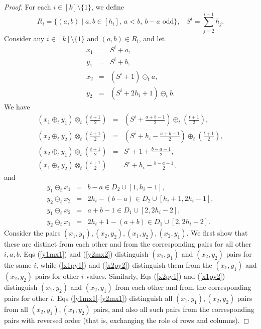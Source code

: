 \documentclass{sn-jnl}
\theoremstyle{definition}
\begin{document}
\begin{proof}
For each $i \in [k]\setminus\{1\}$, we define 
$$R_i = \{ (a,b) \mid a,b \in [h_i], \: a < b, \: b-a \text{ odd} \}, \;\;\; S^i=\sum_{j=2}^{i-1} h_j. $$ 
Consider any $i\in [k]\setminus\{1\}$ and $(a,b)\in R_i$, and let 
\begin{eqnarray*}
    x_1 &=& S^i+a, \\
    y_1 &=& S^i+b, \\
    x_2 &=& (S^i+1) \ominus_t a, \\
    y_2 &=& (S^i+2h_i+1) \ominus_t b.
\end{eqnarray*}
 We have
\begin{eqnarray}
    (x_1 \oplus_t y_1) \otimes_t \left(\frac{t+1}{2}\right) &=& \left(S^i +\frac{a+b-1}{2}\right) \oplus_t \left(\frac{t+1}{2}\right), \label{x1py1} \\
    (x_2 \oplus_t y_2) \otimes_t \left(\frac{t+1}{2}\right) &=& \left(S^i +h_i-\frac{a+b-1}{2}\right)\oplus_t\left(\frac{t+1}{2}\right), \label{x2py2}\\
    (x_2 \oplus_t y_1) \otimes_t \left(\frac{t+1}{2}\right) &=& S^i +1+\frac{b-a-1}{2}, \label{x2py1} \\
     (x_1 \oplus_t y_2) \otimes_t \left(\frac{t+1}{2}\right) &=& S^i +h_i-\frac{b-a-1}{2}, \label{x1py2}
\end{eqnarray}
and
\begin{eqnarray}
y_1 \ominus_t x_1 &=& b-a \in D_2 \cup [1,h_i-1], \label{y1mx1}\\
y_2 \ominus_t x_2 &=& 2h_i - (b-a) \in D_2 \cup[h_i+1,2h_i-1], \label{y2mx2}\\
y_1 \ominus_t x_2 &=& a+b-1 \in D_1 \cup [2,2h_i-2], \label{y1mx2}\\
y_2 \ominus_t x_1 &=& 2h_i+1-(a+b) \in D_1 \cup [2,2h_i-2].\label{y2mx1}
\end{eqnarray}
Consider the pairs $(x_1,y_1),(x_2,y_2),(x_1,y_2),(x_2,y_1)$. We first show that these are distinct from each other and from the corresponding pairs for all other $i,a,b$. Eqs (\ref{y1mx1}) and (\ref{y2mx2}) distinguish $(x_1,y_1)$ and $(x_2,y_2)$ pairs for the same $i$, while (\ref{x1py1}) and (\ref{x2py2}) distinguish them from the $(x_1,y_1)$ and $(x_2,y_2)$ pairs for other $i$ values. Similarly, Eqs (\ref{x2py1}) and (\ref{x1py2}) distinguish $(x_1,y_2)$ and $(x_2,y_1)$ from each other and from the corresponding pairs for other $i$. Eqs
(\ref{y1mx1}-\ref{y2mx1}) distinguish all $(x_1,y_1),(x_2,y_2)$ pairs from all $(x_2,y_1),(x_1,y_2)$ pairs, and also all such pairs from the corresponding pairs with reversed order (that is, exchanging the role of rows and columns).


\end{proof}
\end{document}
